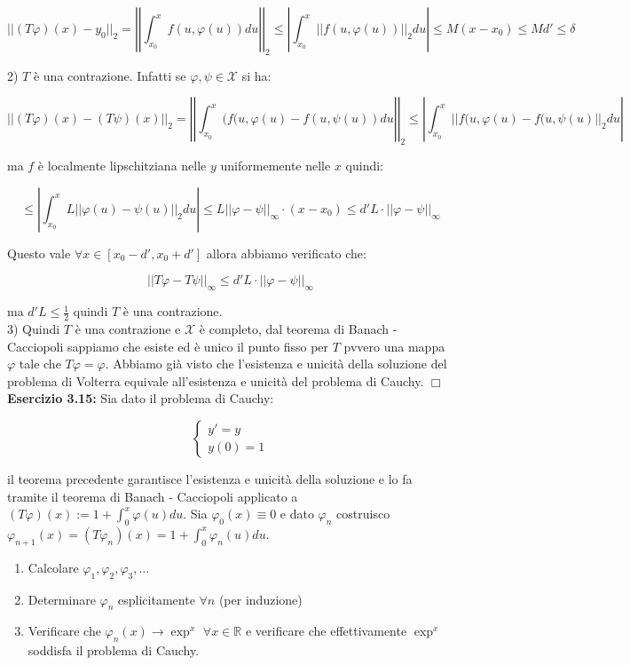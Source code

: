 \documentclass[a4paper,11pt,titlepage]{book}
\begin{document}
$$||(T\varphi)(x)-y_0||_2=\left|\left|\int_{x_0}^x f(u,\varphi(u))du\right|\right|_2\leq\left|\int_{x_0}^x ||f(u,\varphi(u))||_2 du\right|\leq M(x-x_0)\leq Md'\leq\delta$$

2) $T$ è una contrazione. Infatti se $\varphi,\psi\in\mathcal{X}$ si ha: 

$$||(T\varphi)(x)-(T\psi)(x)||_2=\left|\left|\int_{x_0}^x (f(u,\varphi(u)-f(u,\psi(u))du\right|\right|_2\leq\left|\int_{x_0}^x ||f(u,\varphi(u)-f(u,\psi(u)||_2 du\right|$$

ma $f$ è localmente lipschitziana nelle $y$ uniformemente nelle $x$ quindi:

$$\leq\left| \int_{x_0}^x L||\varphi(u)-\psi(u)||_2du\right|\leq L||\varphi-\psi||_\infty\cdot(x-x_0)\leq d'L\cdot||\varphi-\psi||_\infty$$

Questo vale $\forall x\in[x_0-d',x_0+d']$ allora abbiamo verificato che: 

$$||T\varphi-T\psi||_\infty\leq d'L\cdot||\varphi-\psi||_\infty$$

ma $d'L\leq\frac{1}{2}$ quindi $T$ è una contrazione.\\

3) Quindi $T$ è una contrazione e $\mathcal{X}$ è completo, dal teorema di Banach - Cacciopoli sappiamo che esiste ed è unico il punto fisso per $T$ pvvero una mappa $\varphi$ tale che $T\varphi=\varphi$. Abbiamo già visto che l'esistenza e unicità della soluzione del problema di Volterra equivale all'esistenza e unicità del problema di Cauchy. $\Box$\\

\textbf{Esercizio 3.15:} Sia dato il problema di Cauchy:

$$\begin{cases}
y'=y \\
y(0)=1
\end{cases}$$

il teorema precedente garantisce l'esistenza e unicità della soluzione e lo fa tramite il teorema di Banach - Cacciopoli applicato a $(T\varphi)(x):=1+\int_0^x\varphi(u)du$. Sia $\varphi_0(x)\equiv 0$ e dato $\varphi_n$ costruisco $\varphi_{n+1}(x)=(T\varphi_n)(x)=1+\int_0^x\varphi_n(u)du$.\begin{enumerate}
\item Calcolare $\varphi_1,\varphi_2,\varphi_3,\ldots$ 
\item Determinare $\varphi_n$ esplicitamente $\forall n$ (per induzione)
\item Verificare che $\varphi_n(x)\to \exp^x$ $\forall x\in\mathbb{R}$ e verificare che effettivamente $\exp^x$ soddisfa il problema di Cauchy.\\
\end{enumerate}
\end{document}
